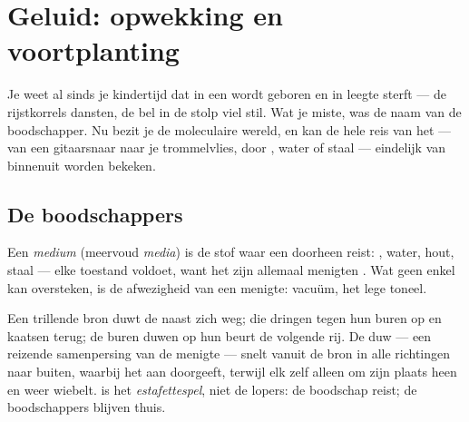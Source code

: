 \chapter{Geluid: opwekking en voortplanting}\label{ch:g7:sound-production}

Je weet al sinds je kindertijd dat  in een  wordt geboren en
in leegte sterft --- de rijstkorrels dansten, de bel in de stolp viel
stil. Wat je miste, was de naam van de boodschapper. Nu bezit je de
moleculaire wereld, en kan de hele reis van het  --- van een
gitaarsnaar naar je trommelvlies, door , water of staal ---
eindelijk van binnenuit worden bekeken.

\section{De boodschappers}

\begin{definition}[Medium]\label{def:g7:sound-production:medium}
Een \emph{medium} (meervoud \emph{media}) is de stof
waar een  doorheen reist: , water, hout, staal ---
elke toestand voldoet, want het zijn allemaal menigten
. Wat geen enkel  kan oversteken, is de
afwezigheid van een menigte: vacuüm, het lege toneel.
\end{definition}

\begin{proposition}\label{prop:g7:sound-production:travel}
Een trillende bron duwt de  naast zich weg; die dringen
tegen hun buren op en kaatsen terug; de buren duwen op hun beurt de
volgende rij. De duw --- een reizende samenpersing van de menigte ---
snelt vanuit de bron in alle richtingen naar buiten, waarbij
 het aan  doorgeeft, terwijl elk
 zelf alleen om zijn plaats heen en weer wiebelt.
 is het \emph{estafettespel}, niet de lopers: de boodschap
reist; de boodschappers blijven thuis.
\end{proposition}


